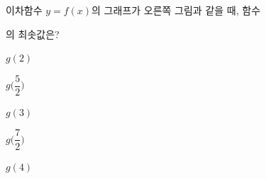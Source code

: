 \noindent\begin{minipage}[t]{0.58\linewidth}\vspace{0pt}\raggedright 이차함수 $y=f(x)$의 그래프가 오른쪽 그림과 같을 때, 함수\par\smallskip\end{minipage}\hfill\begin{minipage}[t]{0.4\linewidth}\vspace{0pt}\centering \resizebox{\ifdim\width>\linewidth\linewidth\else\width\fi}{!}{}\end{minipage}\par
\noindent {}\par\smallskip\noindent 의 최솟값은?
\begin{choices32}{\rule[-3ex]{0pt}{8ex}$g(2)$}{\rule[-3ex]{0pt}{8ex}$g\Big(\dfrac{5}{2}\Big)$}{\rule[-3ex]{0pt}{8ex}$g(3)$}{\rule[-3ex]{0pt}{8ex}$g\Big(\dfrac{7}{2}\Big)$}{\rule[-3ex]{0pt}{8ex}$g(4)$}\end{choices32}
